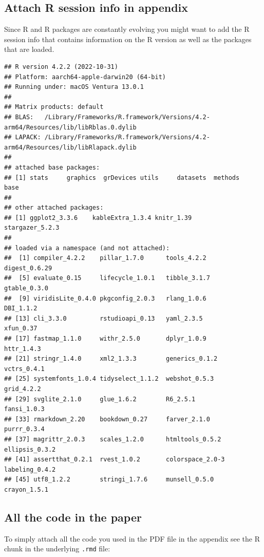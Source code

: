 \documentclass[
  12pt,
]{article}
\begin{document}
\hypertarget{sec:rsessioninfo}{%
\subsection{Attach R session info in appendix}\label{sec:rsessioninfo}}

Since R and R packages are constantly evolving you might want to add the R session info that contains information on the R version as well as the packages that are loaded.

\begin{verbatim}
## R version 4.2.2 (2022-10-31)
## Platform: aarch64-apple-darwin20 (64-bit)
## Running under: macOS Ventura 13.0.1
## 
## Matrix products: default
## BLAS:   /Library/Frameworks/R.framework/Versions/4.2-arm64/Resources/lib/libRblas.0.dylib
## LAPACK: /Library/Frameworks/R.framework/Versions/4.2-arm64/Resources/lib/libRlapack.dylib
## 
## attached base packages:
## [1] stats     graphics  grDevices utils     datasets  methods   base     
## 
## other attached packages:
## [1] ggplot2_3.3.6    kableExtra_1.3.4 knitr_1.39       stargazer_5.2.3 
## 
## loaded via a namespace (and not attached):
##  [1] compiler_4.2.2    pillar_1.7.0      tools_4.2.2       digest_0.6.29    
##  [5] evaluate_0.15     lifecycle_1.0.1   tibble_3.1.7      gtable_0.3.0     
##  [9] viridisLite_0.4.0 pkgconfig_2.0.3   rlang_1.0.6       DBI_1.1.2        
## [13] cli_3.3.0         rstudioapi_0.13   yaml_2.3.5        xfun_0.37        
## [17] fastmap_1.1.0     withr_2.5.0       dplyr_1.0.9       httr_1.4.3       
## [21] stringr_1.4.0     xml2_1.3.3        generics_0.1.2    vctrs_0.4.1      
## [25] systemfonts_1.0.4 tidyselect_1.1.2  webshot_0.5.3     grid_4.2.2       
## [29] svglite_2.1.0     glue_1.6.2        R6_2.5.1          fansi_1.0.3      
## [33] rmarkdown_2.20    bookdown_0.27     farver_2.1.0      purrr_0.3.4      
## [37] magrittr_2.0.3    scales_1.2.0      htmltools_0.5.2   ellipsis_0.3.2   
## [41] assertthat_0.2.1  rvest_1.0.2       colorspace_2.0-3  labeling_0.4.2   
## [45] utf8_1.2.2        stringi_1.7.6     munsell_0.5.0     crayon_1.5.1
\end{verbatim}

\hypertarget{all-the-code-in-the-paper}{%
\subsection{All the code in the paper}\label{all-the-code-in-the-paper}}

To simply attach all the code you used in the PDF file in the appendix see the R chunk in the underlying \texttt{.rmd} file:
\end{document}
